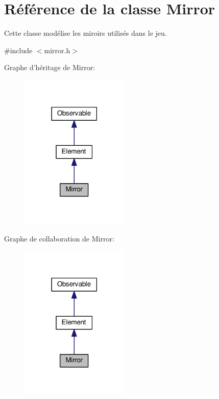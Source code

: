 \hypertarget{classMirror}{\section{Référence de la classe Mirror}
\label{classMirror}
}


Cette classe modélise les miroirs utilisés dans le jeu.  




{\ttfamily \#include $<$mirror.\+h$>$}



Graphe d'héritage de Mirror\+:\nopagebreak
\begin{figure}[H]
\begin{center}
\leavevmode
\includegraphics[width=146pt]{d8/d7d/classMirror__inherit__graph}
\end{center}
\end{figure}


Graphe de collaboration de Mirror\+:\nopagebreak
\begin{figure}[H]
\begin{center}
\leavevmode
\includegraphics[width=146pt]{dc/d9b/classMirror__coll__graph}
\end{center}
\end{figure}
